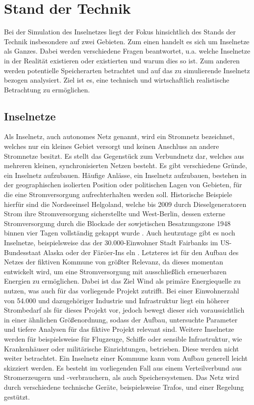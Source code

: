 \chapter{Stand der Technik}

Bei der Simulation des Inselnetzes liegt der Fokus hinsichtlich des Stands der Technik insbesondere auf zwei Gebieten. Zum einen handelt es sich um Inselnetze als Ganzes. Dabei werden verschiedene Fragen beantwortet, u.a. welche Inselnetze in der Realität existieren oder existierten und warum dies so ist. Zum anderen werden potentielle Speicherarten betrachtet und auf das zu simulierende Inselnetz bezogen analysiert. Ziel ist es, eine technisch und wirtschaftlich realistische Betrachtung zu ermöglichen.

\section{Inselnetze}

Als Inselnetz, auch autonomes Netz genannt, wird ein Stromnetz bezeichnet, welches nur ein kleines Gebiet versorgt und keinen Anschluss an andere Stromnetze besitzt. Es stellt das Gegenstück zum Verbundnetz dar, welches aus mehreren kleinen, synchronisierten Netzen besteht. 
Es gibt verschiedene Gründe, ein Inselnetz aufzubauen. Häufige Anlässe, ein Inselnetz aufzubauen, bestehen in der geographischen isolierten Position oder politischen Lagen von Gebieten, für die eine Stromversorgung aufrechterhalten werden soll. Historische Beispiele hierfür sind die Nordseeinsel Helgoland, welche bis 2009 durch Dieselgeneratoren Strom ihre Stromversorgung sicherstellte  und West-Berlin, dessen externe Stromversorgung durch die Blockade der sowjetischen Besatzungszone 1948 binnen vier Tagen vollständig gekappt wurde . Auch heutzutage gibt es noch Inselnetze, beispielsweise das der 30.000-Einwohner Stadt Fairbanks im US-Bundesstaat Alaska  oder der Färöer-Ins eln . Letzteres ist für den Aufbau des Netzes der fiktiven Kommune von größter Relevanz, da dieses momentan entwickelt wird, um eine Stromversorgung mit ausschließlich erneuerbaren Energien zu ermöglichen. Dabei ist das Ziel Wind als primäre Energiequelle zu nutzen, was auch für das vorliegende Projekt zutrifft. Bei einer Einwohnerzahl von 54.000  und dazugehöriger Industrie und Infrastruktur liegt ein höherer Strombedarf als für dieses Projekt vor, jedoch bewegt dieser sich voraussichtlich in einer ähnlichen Größenordnung, sodass der Aufbau, untersuchte Parameter und tiefere Analysen für das fiktive Projekt relevant sind.
Weitere Inselnetze werden für beispielsweise für Flugzeuge, Schiffe oder sensible Infrastruktur, wie Krankenhäuser oder militärische Einrichtungen, betrieben. Diese werden nicht weiter betrachtet.
Ein Inselnetz einer Kommune kann vom Aufbau generell leicht skizziert werden. Es besteht im vorliegenden Fall aus einem Verteilverbund  aus Stromerzeugern und -verbrauchern, als auch Speichersystemen. Das Netz wird durch verschiedene technische Geräte, beispielsweise Trafos, und einer Regelung gestützt. 

